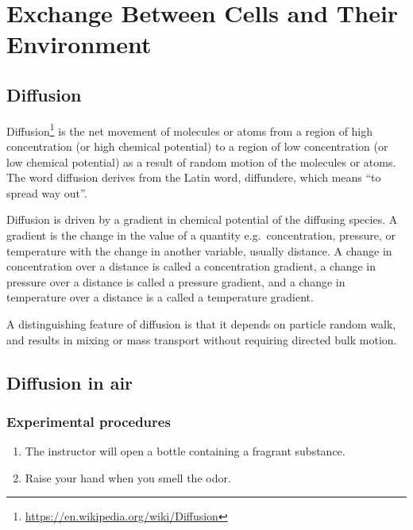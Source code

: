 \documentclass[]{book}
\providecommand{\tightlist}{%
  \setlength{\itemsep}{0pt}\setlength{\parskip}{0pt}}
\let\rmarkdownfootnote\footnote%
\def\footnote{\protect\rmarkdownfootnote}
\renewcommand{\href}[2]{#2\footnote{\url{#1}}}
\begin{document}
\hypertarget{exchange-between-cells-and-their-environment}{%
\chapter{Exchange Between Cells and Their Environment}\label{exchange-between-cells-and-their-environment}}

\hypertarget{diffusion}{%
\section{Diffusion}\label{diffusion}}

\href{https://en.wikipedia.org/wiki/Diffusion}{Diffusion} is the net movement of molecules or atoms from a region of high concentration (or high chemical potential) to a region of low concentration (or low chemical potential) as a result of random motion of the molecules or atoms. The word diffusion derives from the Latin word, diffundere, which means ``to spread way out''.

Diffusion is driven by a gradient in chemical potential of the diffusing species. A gradient is the change in the value of a quantity e.g.~concentration, pressure, or temperature with the change in another variable, usually distance. A change in concentration over a distance is called a concentration gradient, a change in pressure over a distance is called a pressure gradient, and a change in temperature over a distance is a called a temperature gradient.

A distinguishing feature of diffusion is that it depends on particle random walk, and results in mixing or mass transport without requiring directed bulk motion.

\hypertarget{diffusion-in-air}{%
\section{Diffusion in air}\label{diffusion-in-air}}

\hypertarget{experimental-procedures-13}{%
\subsection{Experimental procedures}\label{experimental-procedures-13}}

\begin{enumerate}
\def\labelenumi{\arabic{enumi}.}
\tightlist
\item
  The instructor will open a bottle containing a fragrant substance.
\item
  Raise your hand when you smell the odor.
\end{enumerate}
\end{document}
